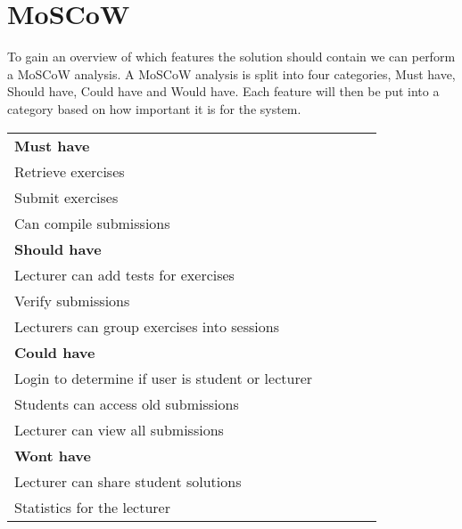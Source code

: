 \section{MoSCoW}

To gain an overview of which features the solution should contain we can perform a MoSCoW analysis.
A MoSCoW analysis is split into four categories, Must have, Should have, Could have and Would have. Each feature will then be put into a category based on how important it is for the system.

\begin{table}[H]
    \begin{tabular}{|l|llll}
    \cline{1-1}
    \cellcolor[HTML]{C0C0C0}\textbf{Must have}        &  &  &  &  \\ \cline{1-1}
    Retrieve exercises                                &  &  &  &  \\ \cline{1-1}
    Submit exercises                                  &  &  &  &  \\ \cline{1-1}
    Can compile submissions                           &  &  &  &  \\ \cline{1-1}
    \cellcolor[HTML]{C0C0C0}\textbf{Should have}      &  &  &  &  \\ \cline{1-1}
    Lecturer can add tests for exercises              &  &  &  &  \\ \cline{1-1}
    Verify submissions                                &  &  &  &  \\ \cline{1-1}
    Lecturers can group exercises into sessions       &  &  &  &  \\ \cline{1-1}
    \cellcolor[HTML]{C0C0C0}\textbf{Could have}       &  &  &  &  \\ \cline{1-1}
    Login to determine if user is student or lecturer &  &  &  &  \\ \cline{1-1}
    Students can access old submissions               &  &  &  &  \\ \cline{1-1}
    Lecturer can view all submissions                 &  &  &  &  \\ \cline{1-1}
    \cellcolor[HTML]{C0C0C0}\textbf{Wont have}        &  &  &  &  \\ \cline{1-1}
    Lecturer can share student solutions              &  &  &  &  \\ \cline{1-1}
    Statistics for the lecturer                       &  &  &  &  \\ \cline{1-1}
    \end{tabular}
    \end{table}
    
